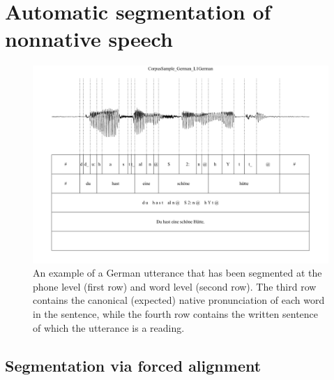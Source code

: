 \section{Automatic segmentation of nonnative speech}
\label{sec:diag:segmentation}


	
	
	
	\begin{figure}
		\centering
		\includegraphics[width=\textwidth]{../img/screenshots/SampleGG-basic}
		\caption{An example of a German utterance that has been segmented at the phone level (first row) and word level (second row). The third row contains the canonical (expected) native pronunciation of each word in the sentence, while the fourth row contains the written sentence of which the utterance is a reading.}
		\label{fig:GGsegmentation}
	\end{figure}

	\subsection{Segmentation via forced alignment}
	\label{sec:segmentation:alignment}
	
